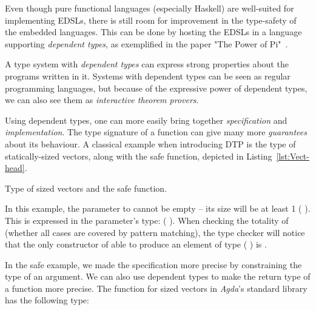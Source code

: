 
    Even though pure functional languages (especially Haskell) are well-suited for implementing \acp{EDSL},
    there is still room for improvement in the type-safety of the embedded languages.
    This can be done by hosting the \acp{EDSL} in a language supporting \emph{dependent types},
    as exemplified in the paper "The Power of Pi"~\cite{power-pi}.

    A type system with \emph{dependent types} can express strong properties about the programs written in it.
    Systems with dependent types can be seen as regular programming languages,
    but because of the expressive power of dependent types, we can also see them as \emph{interactive theorem provers}.

    Using dependent types, one can more easily bring together \emph{specification} and \emph{implementation}.
    The type signature of a function can give many more \emph{guarantees} about its behaviour.
    A classical example when introducing \ac{DTP} is the type of statically-sized vectors,
    along with the safe  function, depicted in Listing~\ref{lst:Vect-head}.

    \begin{listing}[h]
        \caption{Type of sized vectors and the safe  function. \label{lst:Vect-head}}
    \end{listing}

    In this example, the parameter to  cannot be empty – its size will be at least 1 ( ).
    This is expressed in the parameter's type:   ( ).
    When checking the totality of  (whether all cases are covered by pattern matching),
    the type checker will notice that the only constructor of 
    able to produce an element of type   ( ) is .

    In the safe  example, we made the specification more precise by constraining the type of an argument.
    We can also use dependent types to make the return type of a function more precise.
    The  function for sized vectors in \emph{Agda}'s standard library has the following type:

    \begin{center}
    \end{center}

